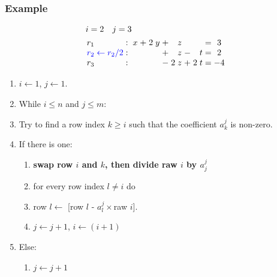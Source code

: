 \documentclass{beamer}
\begin{document}
\begin{frame}
  \frametitle{Example}
  
  \[\arraycolsep=1.4pt
  \begin{aligned}
    &i = 2 \quad j = 3\\
      &
    \begin{array}{lcccccccccccccc}
        r_1  & : &  & x & + & 2 & y & + &  & z &  & & & = & 3\\
        {\color{blue} r_2 \leftarrow r_2/2} & : &   &   &  &   &  & + &   & z & - &  & t  & = & 2\\
        r_3  & : &  &   &  &  &   & - & 2 & z & + & 2 & t & = & -4\\
    \end{array}
  \end{aligned}
  \]
  
  
  \begin{enumerate}
  \item $i \leftarrow 1$, $j \leftarrow 1$.
  \item While $i \le n$ and $j \le m$:
  \item Try to find a row index $k \ge i$ such that the coefficient $a^j_k$ is non-zero.
  \item If there is one:
    \begin{enumerate}
    \item {\bf swap row $i$ and $k$, then divide raw $i$ by $a^{j}_j$}
    \item for every row index $l \neq i$ do 
    \item row $l \leftarrow$ [row $l$ - $a^j_l\times$raw $i$].
    \item $j \leftarrow j+1$, $i \leftarrow (i+1)$
    \end{enumerate}
  \item Else:
    \begin{enumerate}
    \item $j \leftarrow j+1$
    \end{enumerate}
  \end{enumerate}
  
\end{frame}
\end{document}
